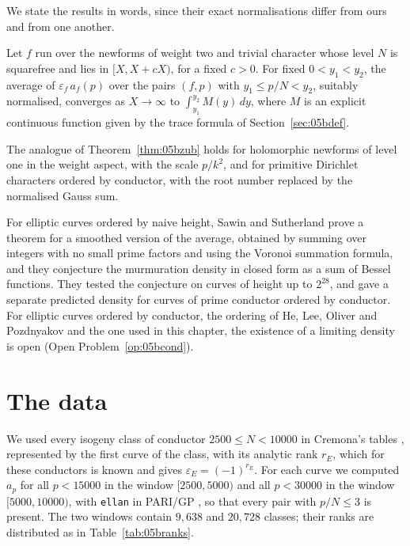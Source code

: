 We state the results in words, since their exact normalisations differ from ours and from one another.

\begin{theorem}\label{thm:05bzub}
Let $f$ run over the newforms of weight two and trivial character whose level $N$ is squarefree and lies in $[X,X+cX)$, for a fixed $c>0$. For fixed $0<y_1<y_2$, the average of $\varepsilon_f\,a_f(p)$ over the pairs $(f,p)$ with $y_1\le p/N<y_2$, suitably normalised, converges as $X\to\infty$ to $\int_{y_1}^{y_2}M(y)\,dy$, where $M$ is an explicit continuous function given by the trace formula of Section~\ref{sec:05bdef}.
\end{theorem}

\begin{theorem}
The analogue of Theorem~\ref{thm:05bzub} holds for holomorphic newforms of level one in the weight aspect, with the scale $p/k^2$, and for primitive Dirichlet characters ordered by conductor, with the root number replaced by the normalised Gauss sum.
\end{theorem}

For elliptic curves ordered by naive height, Sawin and Sutherland \cite{sawinsutherland2025} prove a theorem for a smoothed version of the average, obtained by summing over integers with no small prime factors and using the Voronoi summation formula, and they conjecture the murmuration density in closed form as a sum of Bessel functions. They tested the conjecture on curves of height up to $2^{28}$, and gave a separate predicted density for curves of prime conductor ordered by conductor. For elliptic curves ordered by conductor, the ordering of He, Lee, Oliver and Pozdnyakov and the one used in this chapter, the existence of a limiting density is open (Open Problem~\ref{op:05bcond}).

\section{The data}\label{sec:05bdata}

We used every isogeny class of conductor $2500\le N<10000$ in Cremona's tables \cite{cremonaecdata}, represented by the first curve of the class, with its analytic rank $r_E$, which for these conductors is known and gives $\varepsilon_E=(-1)^{r_E}$. For each curve we computed $a_p$ for all $p<15000$ in the window $[2500,5000)$ and all $p<30000$ in the window $[5000,10000)$, with \texttt{ellan} in PARI/GP \cite{pari2023}, so that every pair with $p/N\le3$ is present. The two windows contain $9{,}638$ and $20{,}728$ classes; their ranks are distributed as in Table~\ref{tab:05branks}.

